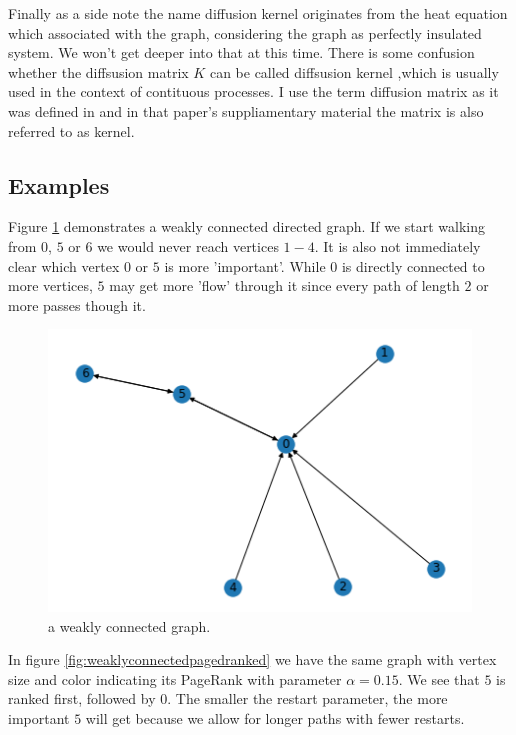 Finally as a side note the name diffusion kernel originates from the heat
equation which associated with the graph, considering the graph 
as perfectly insulated system.
We won't get deeper into that at this time.
There is some confusion whether the diffsusion matrix $K$ can be called
diffsusion kernel ,which is usually used in the context of
contituous processes. I use the term diffusion matrix as it was
defined in \textcite{leiserson2015pan} and in that paper's
suppliamentary material the matrix
is also referred to as kernel.


\subsection*{Examples}

Figure \ref{fig:weaklyconnected} demonstrates a weakly connected
directed graph. If we start walking
from $0$, $5$ or $6$ we would never reach vertices $1-4$. It is also not immediately
clear which vertex $0$ or $5$ is more 'important'. While $0$ is directly
connected to more vertices, $5$ may get more 'flow' through it since every
path of length $2$ or more passes though it. 

\begin{figure}[!htb]
\begin{framed}
  \centering
    \includegraphics[width=0.55\linewidth]{figures/directed_graph_example_unranked.png}
  \caption{a weakly connected graph.}
  \label{fig:weaklyconnected}
\end{framed}
\end{figure}

In figure \ref{fig:weaklyconnectedpagedranked} we have the same
graph with vertex size and color indicating its PageRank with
parameter $\alpha=0.15$. We see that $5$ is ranked first, followed
by $0$. The smaller the restart parameter, the more important $5$
will get because we allow for longer paths with fewer restarts.


